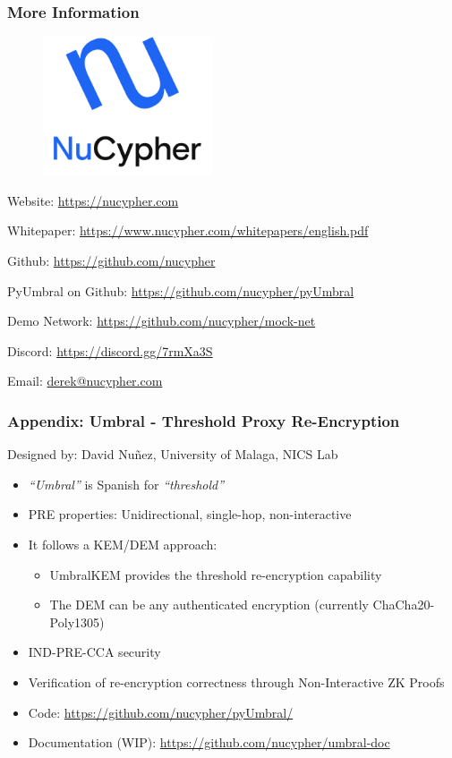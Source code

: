 \documentclass[xetex,mathsans,sans,aspectratio=169]{beamer}
\begin{document}
    \begin{frame}
        \frametitle{More Information}
        \begin{figure}
            \centering
            \includegraphics[width=5cm]{pdf/nucypher_logo.pdf}
        \end{figure}
        Website: \url{https://nucypher.com}

        Whitepaper: \url{https://www.nucypher.com/whitepapers/english.pdf}

        Github: \url{https://github.com/nucypher}

        PyUmbral on Github: \url{https://github.com/nucypher/pyUmbral}

        Demo Network: \url{https://github.com/nucypher/mock-net}

        Discord: \url{https://discord.gg/7rmXa3S}

        Email: \href{mailto:derek@nucypher.com}{derek@nucypher.com}
    \end{frame}

    \begin{frame}
      \frametitle{Appendix: Umbral - Threshold Proxy Re-Encryption}
      Designed by: David Nu\~{n}ez, University of Malaga, NICS Lab
      \begin{itemize}
          \item \emph{``Umbral''} is Spanish for \emph{``threshold''}
          \item PRE properties: Unidirectional, single-hop, non-interactive
          \item It follows a KEM/DEM approach:
          \begin{itemize}
              \item UmbralKEM provides the threshold re-encryption capability
              \item The DEM can be any authenticated encryption (currently ChaCha20-Poly1305)
          \end{itemize}
          \item IND-PRE-CCA security
          \item Verification of re-encryption correctness through Non-Interactive ZK Proofs
          \item Code: \url{https://github.com/nucypher/pyUmbral/}
          \item Documentation (WIP): \url{https://github.com/nucypher/umbral-doc}
      \end{itemize}
    \end{frame}
\end{document}
